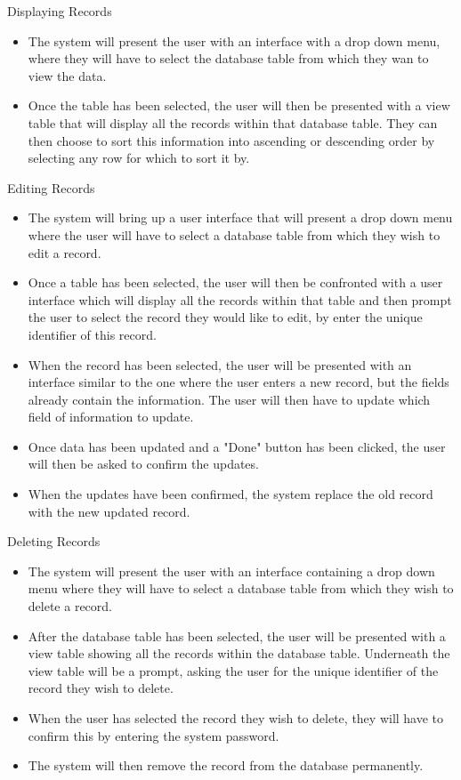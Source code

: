 \newpage

Displaying Records
\begin{itemize}
    \item The system will present the user with an interface with a drop down menu, where they will have to select the database  table from which they wan to view the data.
    \item Once the table has been selected, the user will then be presented with a view table that will display all the records within that database  table. They can then choose to sort this information into ascending or descending order by selecting any row for which to sort it by.
\end{itemize}

Editing Records
\begin{itemize}
    \item The system will bring up a user interface that will present a drop down menu where the user will have to select a database table from which they wish to edit a record.
    \item Once a table has been selected, the user will then be confronted with a user interface which will display all the records within that table and then prompt the user to select the record they would like to edit, by enter the unique identifier of this record.
    \item When the record has been selected, the user will be presented with an interface similar to the one where the user enters a new record, but the fields already contain the information. The user will then have to update which field of information to update.
    \item Once data has been updated and a "Done" button has been clicked, the user will then be asked to confirm the updates.
    \item When the updates have been confirmed, the system replace the old record with the new updated record.
\end{itemize}

Deleting Records
\begin{itemize}
    \item The system will present the user with an interface containing a drop down menu where they will have to select a database table from which they wish to delete a record.
    \item After the database table has been selected, the user will be presented with a view table showing all the records within the database table. Underneath the view table will be a prompt, asking the user for the unique identifier of the record they wish to delete.
    \newpage
    \item When the user has selected the record they wish to delete, they will have to confirm this by entering the system password.
    \item The system will then remove the record from the database permanently.
\end{itemize}

